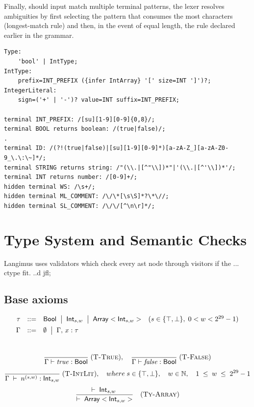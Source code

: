 Finally, should input match multiple terminal patterns, the lexer resolves ambiguities by first selecting the pattern that consumes the most characters (longest-match rule) and then, in the event of equal length, the rule declared earlier in the grammar.

\begin{verbatim}
Type:
    'bool' | IntType;
IntType:
    prefix=INT_PREFIX ({infer IntArray} '[' size=INT ']')?;
IntegerLiteral:
    sign=('+' | '-')? value=INT suffix=INT_PREFIX;

terminal INT_PREFIX: /[su][1-9][0-9]{0,8}/;
terminal BOOL returns boolean: /(true|false)/;
.
terminal ID: /(?!(true|false)|[su][1-9][0-9]*)[a-zA-Z_][a-zA-Z0-9_\.\:\~]*/;
terminal STRING returns string: /"(\\.|[^"\\])*"|'(\\.|[^'\\])*'/;
terminal INT returns number: /[0-9]+/;
hidden terminal WS: /\s+/;
hidden terminal ML_COMMENT: /\/\*[\s\S]*?\*\//;
hidden terminal SL_COMMENT: /\/\/[^\n\r]*/;
\end{verbatim}

\section{Type System and Semantic Checks}

Langimus uses validators which check every ast node through visitors if the ... ctype fit. ..d jfl;

\subsection*{Base axioms}
\[
  \begin{array}{rcll}
    \tau   & ::=                                & \mathsf{Bool}
    \;\bigm|\; \mathsf{Int}_{s,w}
    \;\bigm|\; \mathsf{Array}<\mathsf{Int}_{s,w}>
           & (s\in\{\top,\bot\},\;0<w<2^{29}-1)                 \\[1ex]
    \Gamma & ::=                                & \emptyset
    \;\bigm|\; \Gamma,\,x:\tau
  \end{array}
\]
\\
\[
  \frac{}{\Gamma \vdash \mathit{true} : \mathsf{Bool}}
  \; (\textsc{T-True}), \quad
  \frac{}{\Gamma \vdash \mathit{false} : \mathsf{Bool}}
  \; (\textsc{T-False})
\]
\[
  \frac{}
  {\Gamma \;\vdash\; n^{(s,w)} : \mathsf{Int}_{s,w}}
  \; (\textsc{T-IntLit}), \quad
  where\;
  s \in \{\top, \bot\},
  \quad
  w \in \mathbb{N},
  \quad
  1 \;\le\; w \;\le\; 2^{29}-1
\]
\[
  \frac{\vdash\;\mathsf{Int}_{s,w}\;}
  {\vdash\;\mathsf{Array}<\mathsf{Int}_{s,w}>}
  \quad(\textsc{Ty-Array})
\]

